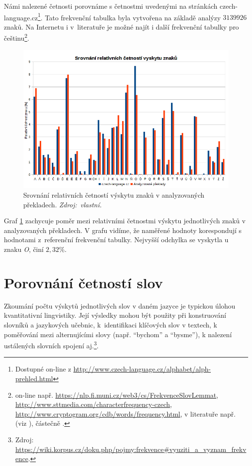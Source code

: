 \documentclass[dp.tex]{subfiles}
\begin{document}
Námi nalezené četnosti porovnáme s četnostmi uvedenými na stránkách czech-language.cz\footnote{Dostupné on-line z \url{http://www.czech-language.cz/alphabet/alph-prehled.html}}. Tato frekvenční tabulka byla vytvořena na základě analýzy $3 139 926$ znaků. Na Internetu i v~literatuře je možné najít i další frekvenční tabulky pro češtinu\footnote{on-line např. \url{https://nlp.fi.muni.cz/web3/cs/FrekvenceSlovLemmat}, \url{http://www.sttmedia.com/characterfrequency-czech}, \url{http://www.cryptogram.org/cdb/words/frequency.html}, v literatuře např.  (viz \cite{Kraus1965}), částečně  \cite[str.~109-121]{Tesitelova1987}.}.

\begin{figure}[h!]
	\centering
	\includegraphics[max width=\textwidth,keepaspectratio=true]{imgs-70-prakticka/cetnost-znaku2}
	\caption[Srovnání relativních četností výskytu znaků v analyzovaných překladech.]{Srovnání relativních četností výskytu znaků v analyzovaných překladech. \textit{Zdroj:~vlastní.}}
	\label{fig:character-freq}
\end{figure}

Graf \ref{fig:character-freq} zachycuje poměr mezi relativními četnostmi výskytu jednotlivých znaků v analyzovaných překladech. V grafu vidíme, že naměřené hodnoty korespondují s hodnotami z~referenční frekvenční tabulky. Nejvyšší odchylka se vyskytla u znaku \textit{O}, činí $2{,}32 \%$.

\section{Porovnání četností slov}

Zkoumání počtu výskytů jednotlivých slov v daném jazyce je typickou úlohou kvantitativní lingvistiky. Její výsledky mohou být použity při konstruování slovníků a jazykových učebnic, k~identifikaci klíčových slov v textech, k poměřování mezi alternujícími slovy (např. \enquote{bychom} a \enquote{bysme}), k nalezení ustálených slovních spojení aj.\footnote{Zdroj: \url{https://wiki.korpus.cz/doku.php/pojmy:frekvence\#vyuziti_a_vyznam_frekvence}.}.
\end{document}
